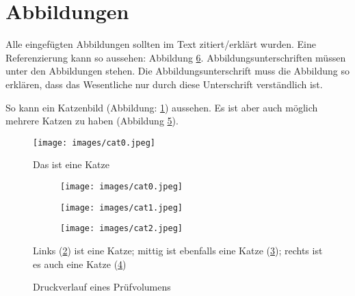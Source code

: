 \documentclass[a4paper, 12pt]{article}
\begin{document}
\section{Abbildungen}
Alle eingefügten Abbildungen sollten im Text zitiert/erklärt wurden. Eine Referenzierung kann so aussehen: Abbildung \ref{fig:pressure_plot}. Abbildungsunterschriften müssen unter den Abbildungen stehen. Die Abbildungsunterschrift muss die Abbildung so erklären, dass das Wesentliche nur durch diese Unterschrift verständlich ist.

So kann ein Katzenbild (Abbildung: \ref{fig:cat0}) aussehen. Es ist aber auch möglich mehrere Katzen zu haben (Abbildung \ref{fig:testfig}).
\begin{figure}[ht]
    \centering
    \texttt{[image: images/cat0.jpeg]}
    \caption{Das ist eine Katze}
    \label{fig:cat0}
\end{figure}

\begin{figure}[ht]
    \centering
    \begin{subfigure}[b]{0.3\textwidth}
        \centering
        \texttt{[image: images/cat0.jpeg]}
        \caption{}
        \label{fig:cat0_0}
    \end{subfigure}
    \hfill
    \begin{subfigure}[b]{0.3\textwidth}
        \centering
        \texttt{[image: images/cat1.jpeg]}
        \caption{}
        \label{fig:cat1_0}
    \end{subfigure}
    \hfill
    \begin{subfigure}[b]{0.3\textwidth}
        \centering
        \texttt{[image: images/cat2.jpeg]}
        \caption{}
        \label{fig:cat2_0}
    \end{subfigure}
    \caption[Katzen Bilder]{Links (\ref{fig:cat0_0}) ist eine Katze; mittig ist ebenfalls eine Katze (\ref{fig:cat1_0}); rechts ist es auch eine Katze (\ref{fig:cat2_0})}
    \label{fig:testfig}
\end{figure}

\begin{figure}[ht]
    \centering
    
    \caption{Druckverlauf eines Prüfvolumens}
    \label{fig:pressure_plot}
\end{figure}
\end{document}
